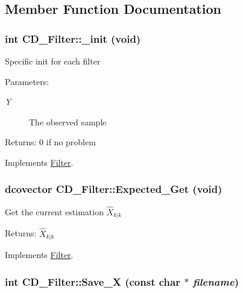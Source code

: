 \subsection{Member Function Documentation}
\hypertarget{class_c_d___filter_789c745e24ee5534d22455dff70a93b3}{
\subsubsection[{\_\-init}]{\setlength{\rightskip}{0pt plus 5cm}int CD\_\-Filter::\_\-init (void)}}
\label{class_c_d___filter_789c745e24ee5534d22455dff70a93b3}


Specific init for each filter

\begin{Desc}
\item[Parameters:]
\begin{description}
\item[{\em Y}]The observed sample\end{description}
\end{Desc}
\begin{Desc}
\item[Returns:]0 if no problem \end{Desc}


Implements \hyperlink{class_filter_f46a456184971270ca36733d937f14fb}{Filter}.\hypertarget{class_c_d___filter_f5c2b82877e5cdad1e0cc782374809b0}{
\subsubsection[{Expected\_\-Get}]{\setlength{\rightskip}{0pt plus 5cm}dcovector CD\_\-Filter::Expected\_\-Get (void)}}
\label{class_c_d___filter_f5c2b82877e5cdad1e0cc782374809b0}


Get the current estimation $ \hat{X}_{k|k} $

\begin{Desc}
\item[Returns:]$ \hat{X}_{k|k} $ \end{Desc}


Implements \hyperlink{class_filter_f6e41ec8ada47571291b31a259858cdc}{Filter}.\hypertarget{class_c_d___filter_b304de0cc156193c9e938188c1092188}{
\subsubsection[{Save\_\-X}]{\setlength{\rightskip}{0pt plus 5cm}int CD\_\-Filter::Save\_\-X (const char $\ast$ {\em filename})}}
\label{class_c_d___filter_b304de0cc156193c9e938188c1092188}


